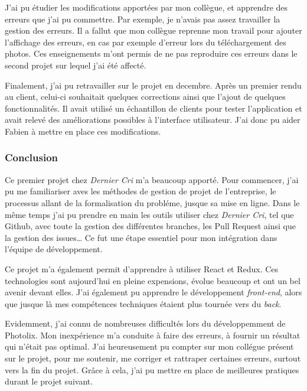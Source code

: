 \bigskip

J'ai pu étudier les modifications apportées par mon collègue, et
apprendre des erreurs que j'ai pu commettre. Par exemple, je n'avais pas
assez travailler la gestion des erreurs. Il a fallut que mon collègue
reprenne mon travail pour ajouter l'affichage des erreurs, en cas par
exemple d'erreur lors du téléchargement des photos. Ces enseignements
m'ont permis de ne pas reproduire ces erreurs dans le second projet sur
lequel j'ai été affecté.

\bigskip

Finalement, j'ai pu retravailler sur le projet en decembre. Après un
premier rendu au client, celui-ci souhaitait quelques corrections ainsi
que l'ajout de quelques fonctionnalités. Il avait utilisé un échantillon
de clients pour tester l'application et avait relevé des améliorations
possibles à l'interface utilisateur. J'ai donc pu aider Fabien à mettre
en place ces modifications.

\bigskip

\subsubsection{Conclusion}\label{conclusion}

\bigskip

Ce premier projet chez \emph{Dernier Cri} m'a beaucoup apporté. Pour
commencer, j'ai pu me familiariser aves les méthodes de gestion de
projet de l'entreprise, le processus allant de la formalisation du
probléme, jusque sa mise en ligne. Dans le même temps j'ai pu prendre en
main les outils utiliser chez \emph{Dernier Cri}, tel que Github, avec
toute la gestion des différentes branches, les Pull Request ainsi que la
gestion des issues\ldots{} Ce fut une étape essentiel pour mon
intégration dans l'équipe de développement.

\bigskip

Ce projet m'a également permit d'apprendre à utiliser React et Redux.
Ces technologies sont aujourd'hui en pleine expensions, évolue beaucoup
et ont un bel avenir devant elles. J'ai également pu apprendre le
développement \emph{front-end}, alors que jusque là mes compétences
techniques étaient plus tournée vers du \emph{back}.

\bigskip

Evidemment, j'ai connu de nombreuses difficultés lors du développemment
de Photolix. Mon inexpérience m'a conduite à faire des erreurs, à
fournir un résultat qui n'était pas optimal. J'ai heureusement pu
compter sur mon collégue présent sur le projet, pour me soutenir, me
corriger et rattraper certaines erreurs, surtout vers la fin du projet.
Grâce à cela, j'ai pu mettre en place de meilleures pratiques durant le
projet suivant.

